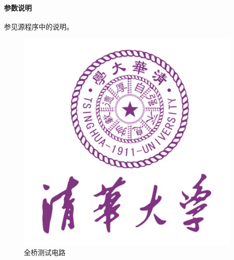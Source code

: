 \paragraph{参数说明} 参见源程序中的说明。

\begin{figure}[htbp]
\centering
\includegraphics[width=11cm]{resource/logo.jpg}
\caption{全桥测试电路}
\label{fig:fullarm}
\end{figure}


